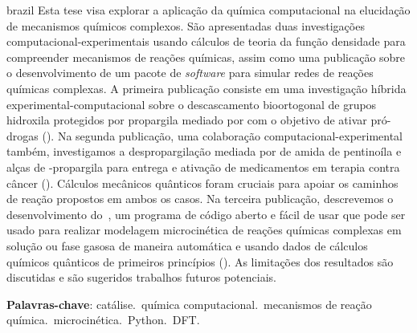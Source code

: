 \begin{resumo}[Resumo]
	\begin{otherlanguage*}{brazil}
		Esta tese visa explorar a aplicação da química computacional na elucidação de mecanismos químicos complexos.
		São apresentadas duas investigações computacional-experimentais usando cálculos de teoria da função densidade para compreender mecanismos de reações químicas,
		assim como uma publicação sobre o desenvolvimento de um pacote de \emph{software} para simular redes de reações químicas complexas.
		A primeira publicação consiste em uma investigação híbrida experimental-computacional sobre o descascamento bioortogonal de grupos hidroxila protegidos por propargila mediado por  com o objetivo de ativar pró-drogas
		().
		Na segunda publicação,
		uma colaboração computacional-experimental também,
		investigamos a despropargilação mediada por  de amida de pentinoíla e alças de -propargila para entrega e ativação de medicamentos em terapia contra câncer
		().
		Cálculos mecânicos quânticos foram cruciais para apoiar os caminhos de reação propostos em ambos os casos.
		Na terceira publicação,
		descrevemos o desenvolvimento do~\overreact{},
		um programa de código aberto e fácil de usar que pode ser usado
		para realizar modelagem microcinética de reações químicas complexas em solução ou fase gasosa
		de maneira automática e
		usando dados de cálculos químicos quânticos de primeiros princípios
		().
		As limitações dos resultados são discutidas e são sugeridos trabalhos futuros potenciais.

		\vspace{\onelineskip}

		\noindent
		\textbf{Palavras-chave}:
		catálise.\ química computacional.\ mecanismos de reação química.\ microcinética.\ Python.\ DFT.\@
	\end{otherlanguage*}
\end{resumo}

